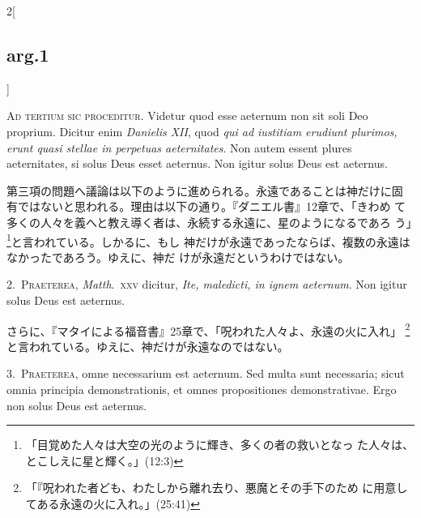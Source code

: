\documentclass[paper=a4paper,fontsize=10pt,jafontsize=9pt,titlepage]{jlreq}
\begin{document}
{}
\setcounter{section}{3}
\setcounter{subsection}{0}

\begin{paracol}{2}[\subsection{arg.1}]

{\huge A}{\scshape d tertium sic proceditur}. Videtur quod esse aeternum
non sit soli Deo proprium. Dicitur enim {\itshape Danielis XII}, quod
{\itshape qui ad iustitiam erudiunt plurimos, erunt quasi stellae in
perpetuas aeternitates}. Non autem essent plures aeternitates, si solus
Deus esset aeternus. Non igitur solus Deus est aeternus.

\switchcolumn

第三項の問題へ議論は以下のように進められる。永遠であることは神だけに固
有ではないと思われる。理由は以下の通り。『ダニエル書』12章で、「きわめ
て多くの人々を義へと教え導く者は、永続する永遠に、星のようになるであろ
う」\footnote{「目覚めた人々は大空の光のように輝き、多くの者の救いとなっ
た人々は、とこしえに星と輝く。」(12:3)}と言われている。しかるに、もし
神だけが永遠であったならば、複数の永遠はなかったであろう。ゆえに、神だ
けが永遠だというわけではない。


2.~{\scshape Praeterea}, {\itshape Matth}.~{\scshape xxv} dicitur, {\itshape
Ite, maledicti, in ignem aeternum}. Non igitur solus Deus est aeternus.

\switchcolumn

さらに、『マタイによる福音書』25章で、「呪われた人々よ、永遠の火に入れ」
 \footnote{「『呪われた者ども、わたしから離れ去り、悪魔とその手下のため
 に用意してある永遠の火に入れ。」(25:41)}
と言われている。ゆえに、神だけが永遠なのではない。


3.~{\scshape Praeterea}, omne necessarium est aeternum. Sed multa sunt
necessaria; sicut omnia principia demonstrationis, et omnes
propositiones demonstrativae. Ergo non solus Deus est aeternus.


\end{paracol}
\end{document}
